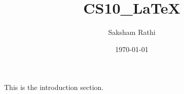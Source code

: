 \documentclass{article}
\title{CS10\_LaTeX}
\author{Saksham Rathi}
\date{\today}
\begin{document}
\maketitle

This is the introduction section.

\end{document}
